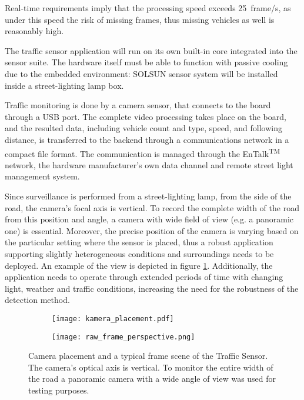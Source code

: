 Real-time requirements imply that the processing speed exceeds \SI{25}{frame/s}, as under this speed the risk of missing frames, thus missing vehicles as well is reasonably high.

The traffic sensor application will run on its own built-in core integrated into the sensor suite.
The hardware itself must be able to function with passive cooling due to the embedded environment: SOLSUN sensor system will be installed inside a street-lighting lamp box.

Traffic monitoring is done by a camera sensor, that connects to the board through a USB port.
The complete video processing takes place on the board, and the resulted data, including vehicle count and type, speed, and following distance, is transferred to the backend through a communications network in a compact file format.
The communication is managed through the EnTalk\textsuperscript{TM} network, the hardware manufacturer's own data channel and remote street light management system\cite{EnTalk}.

Since surveillance is performed from a street-lighting lamp, from the side of the road, the camera's focal axis is vertical.
To record the complete width of the road from this position and angle, a camera with wide field of view (e.g. a panoramic one) is essential.
Moreover, the precise position of the camera is varying based on the particular setting where the sensor is placed, thus a robust application supporting slightly heterogeneous conditions and surroundings needs to be deployed. 
An example of the view is depicted in figure \ref{fig:camera_position}.
Additionally, the application needs to operate through extended periods of time with changing light, weather and traffic conditions, increasing the need for the robustness of the detection method.

\begin{figure}
	\centering
	\begin{subfigure}[b]{.5\textwidth}
		\centering
		\texttt{[image: kamera\_placement.pdf]}
	\end{subfigure}%
	\begin{subfigure}[b]{.5\textwidth}
		\centering
		\texttt{[image: raw\_frame\_perspective.png]}
	\end{subfigure}
	\caption{Camera placement and a typical frame scene of the Traffic Sensor. The camera's optical axis is vertical. To monitor the entire width of the road a panoramic camera with a wide angle of view was used for testing purposes.}
	\label{fig:camera_position}
\end{figure}

